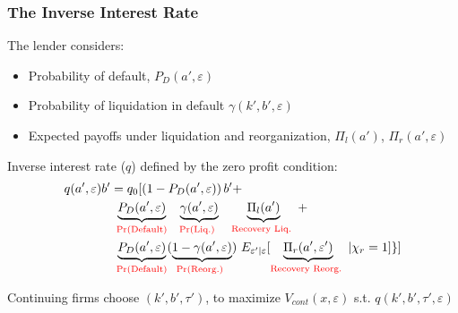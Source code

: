 \documentclass[aspectratio=169,xcolor=table]{beamer}
\begin{document}
\begin{frame}[label=Qfull] \frametitle{The Inverse Interest Rate  \hfill \hyperlink{Model Summary}{}}

The lender considers: \small 
\begin{itemize}\setlength\itemsep{0em} 
    \item Probability of default, $P_D(a', \varepsilon)$
    \item Probability of liquidation in default $\gamma(k',b', \varepsilon)$
    \item Expected payoffs under liquidation and reorganization,  $\Pi_{l}(a')$, $\Pi_{r}(a', \varepsilon)$
\end{itemize} \normalsize

Inverse interest rate ($q$) defined by the zero profit condition:
\begin{equation*} \label{eq:q}
    \begin{split}
        & q(a', \varepsilon)b' = q_0 [ \left(1-P_D(a', \varepsilon)\right)b' +  \\
        & \qquad \qquad \underbrace{P_D(a', \varepsilon)}_{\textcolor{red}{\text{Pr(Default)}}} \underbrace{\gamma(a', \varepsilon)}_{\textcolor{red}{\text{\quad Pr(Liq.) \quad }}} \underbrace{\Pi_{l}(a')}_{\textcolor{red}{\text{Recovery Liq. }}} + \\  
        & \qquad  \qquad \underbrace{P_D(a', \varepsilon)}_{\textcolor{red}{\text{Pr(Default)}}}  (\underbrace{1-\gamma(a', \varepsilon)}_{\textcolor{red}{\text{Pr(Reorg.) }}})\ E_{\varepsilon' | \varepsilon} [ \underbrace{\Pi_{r}(a', \varepsilon')}_{\textcolor{red}{\text{Recovery Reorg. }}} |\chi_r = 1 ] \} ]
    \end{split}
\end{equation*}

Continuing firms choose $(k',b',\tau')$, to maximize $V_{cont}(x,\varepsilon)$ s.t. $q(k',b',\tau', \varepsilon)$ 

\end{frame}
\end{document}
